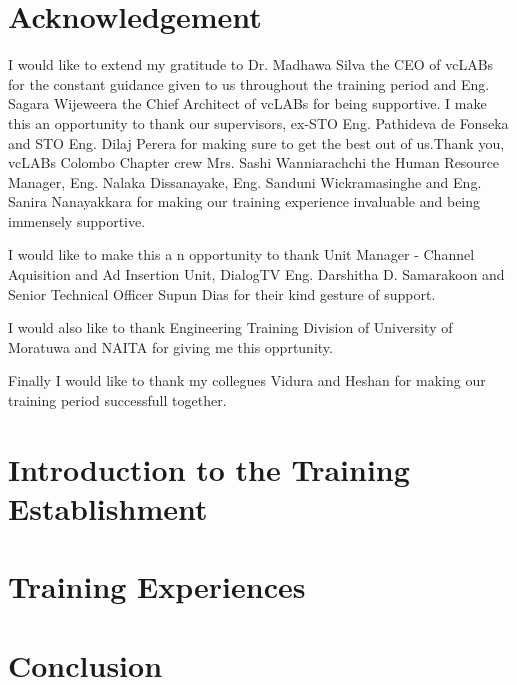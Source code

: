 \documentclass[12pt, a4paper]{report}
\begin{document}
\chapter*{Acknowledgement}
I would like to extend my gratitude to Dr. Madhawa Silva the CEO of vcLABs for the constant guidance given to us throughout the training period and Eng. Sagara Wijeweera the Chief Architect of vcLABs for being supportive. I make this an opportunity to thank our supervisors, ex-STO Eng. Pathideva de Fonseka and STO Eng. Dilaj Perera for making sure to get the best out of us.Thank you, vcLABs Colombo Chapter crew Mrs. Sashi Wanniarachchi the Human Resource Manager, Eng. Nalaka Dissanayake, Eng. Sanduni Wickramasinghe and Eng. Sanira Nanayakkara for making our training experience invaluable and being immensely supportive.

I would like to make this a n opportunity to thank Unit Manager - Channel Aquisition and Ad Insertion Unit, DialogTV Eng. Darshitha D. Samarakoon and Senior Technical Officer Supun Dias for their kind gesture of support.

I would also like to thank Engineering Training Division of University of Moratuwa and NAITA for giving me this opprtunity.

Finally I would like to thank my collegues Vidura and Heshan for making our training period successfull together.

\tableofcontents

\listoffigures

\listoftables

\newpage
\renewcommand{\thepage}{\arabic{page}} %
\setcounter{page}{1} %
\chapter{Introduction to the Training Establishment}


\chapter{Training Experiences}


\chapter{Conclusion}

\end{document}
